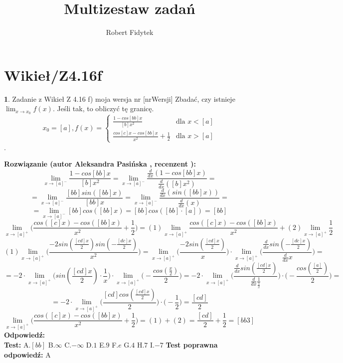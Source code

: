 \documentclass[12pt, a4paper]{article}
\title{Multizestaw zadań}
\author{Robert Fidytek}
\date{}
\theoremstyle{definition} %
\newtheorem{zad}{}
\newcommand{\kategoria}[1]{\section{#1}} %
\newcommand{\zadStart}[1]{\begin{zad}#1\newline} %
\newcommand{\zadStop}{\end{zad}}   %
\newcommand{\rozwStart}[2]{\noindent \textbf{Rozwiązanie (autor #1 , recenzent #2): }\newline} %
\newcommand{\rozwStop}{\newline}                                            %
\newcommand{\odpStart}{\noindent \textbf{Odpowiedź:}\newline}    %
\newcommand{\odpStop}{\newline}                                             %
\newcommand{\testStart}{\noindent \textbf{Test:}\newline} %
\newcommand{\testStop}{\newline} %
\newcommand{\kluczStart}{\noindent \textbf{Test poprawna odpowiedź:}\newline} %
\newcommand{\kluczStop}{\newline} %
\begin{document}
\maketitle


\kategoria{Wikieł/Z4.16f}
\zadStart{Zadanie z Wikieł Z 4.16 f) moja wersja nr [nrWersji]}
Zbadać, czy istnieje $\lim_{x\rightarrow x_{0}}f(x)$. Jeśli tak, to obliczyć tę granicę. $$x_{0}=[a],f(x)= \left\{ \begin{array}{ll}
\frac{1-cos[bb]x}{[b]x^2} & \textrm{dla $x<[a]$}\\
\frac{cos[c]x-cos[bb]x}{x^2}+\frac{1}{2} & \textrm{dla $x>[a]$}
\end{array} \right.$$.
\zadStop
\rozwStart{Aleksandra Pasińska}{}
$$\lim_{x\rightarrow [a]^-}\frac{1-cos[bb]x}{[b]x^2}=\lim_{x\rightarrow [a]^-}\frac{\frac{d}{dx}(1-cos[bb]x)}{\frac{d}{dx}([b]x^2)}=$$
$$=\lim_{x\rightarrow [a]^-}\frac{[bb]sin([bb]x)}{[bb]x}=\lim_{x\rightarrow [a]^-}\frac{\frac{d}{dx}(sin([bb]x))}{\frac{d}{dx}(x)}=$$
$$=\lim_{x\rightarrow [a]^-}[bb]cos([bb]x)=[bb]cos([bb]\cdot [a])=[bb]$$
$$\lim_{x\rightarrow [a]^+}\biggl(\frac{cos([c]x)-cos([bb]x)}{x^2}+\frac{1}{2}\biggr)=(1)\lim_{x\rightarrow [a]^+}\frac{cos([c]x)-cos([bb]x)}{x^2}+(2)\lim_{x\rightarrow [a]^+}\frac{1}{2}$$
$$(1)\lim_{x\rightarrow [a]^+}\biggl(\frac{-2sin(\frac{[cd]x}{2})sin(-\frac{[dc]x}{2})}{x^2}\biggr)=\lim_{x\rightarrow [a]^+}\biggl(\frac{-2sin(\frac{[cd]x}{2})}{x}\biggr)\cdot \lim_{x\rightarrow [a]^+}\biggl(\frac{\frac{d}{dx}sin(-\frac{[dc]x}{2})}{\frac{d}{dx}x}\biggr)=$$
$$=-2\cdot \lim_{x\rightarrow [a]^+}\biggl(sin(\frac{[cd]x}{2})\cdot \frac{1}{x}\biggr)\cdot \lim_{x\rightarrow [a]^+}\biggl(-\frac{cos(\frac{x}{2})}{2}\biggr)=-2\cdot \lim_{x\rightarrow [a]^+}\biggl(\frac{\frac{d}{dx}sin(\frac{[cd]x}{2})}{\frac{d}{dx}\frac{1}{\frac{1}{x}}}\biggr)\cdot \biggl(-\frac{cos(\frac{[a]}{2})}{2}\biggr)=$$ $$=-2\cdot \lim_{x\rightarrow [a]^+}\biggl(\frac{[cd]cos(\frac{[cd]x}{2})}{2}\biggr)\cdot \biggl(-\frac{1}{2}\biggr)=\frac{[cd]}{2}$$
$$\lim_{x\rightarrow [a]^+}\biggl(\frac{cos([c]x)-cos([bb]x)}{x^2}+\frac{1}{2}\biggr)=(1)+(2)=\frac{[cd]}{2}+\frac{1}{2}=[bb3]$$
\rozwStop
\odpStart
[bb]\\
\odpStop
\testStart
A.$[bb]$
B.$\infty$
C.$-\infty$
D.$1$
E.$9$
F.$e$
G.$4$
H.$7$
I.$-7$
\testStop
\kluczStart
A
\kluczStop
\end{document}
